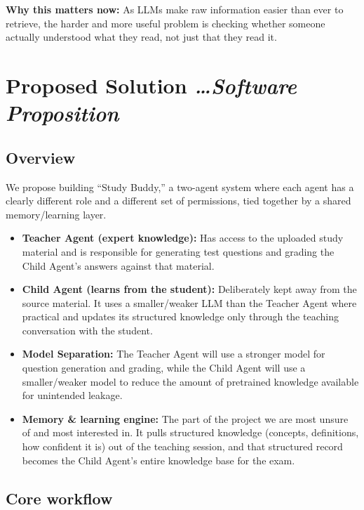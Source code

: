 \documentclass[11pt,a4paper]{article}
\newcommand{\mysection}[2]{%
    \section[#1]{#1 \hfill {\normalfont\itshape #2}}
}
\begin{document}
\textbf{Why this matters now:} As LLMs make raw information easier than ever to retrieve, the harder and more useful problem is checking whether someone actually understood what they read, not just that they read it.


\mysection{Proposed Solution}{\ldots Software Proposition}

\subsection{Overview}

We propose building ``Study Buddy,'' a two-agent system where each agent has a clearly different role and a different set of permissions, tied together by a shared memory/learning layer.

\begin{itemize}

    \item \textbf{Teacher Agent (expert knowledge):} Has access to the uploaded study material and is responsible for generating test questions and grading the Child Agent's answers against that material.

    \item \textbf{Child Agent (learns from the student):} Deliberately kept away from the source material. It uses a smaller/weaker LLM than the Teacher Agent where practical and updates its structured knowledge only through the teaching conversation with the student.

    \item\textbf{Model Separation:} The Teacher Agent will use a stronger model for question generation and grading, while the Child Agent will use a smaller/weaker model to reduce the amount of pretrained knowledge available for unintended leakage.

    \item \textbf{Memory \& learning engine:} The part of the project we are most unsure of and most interested in. It pulls structured knowledge (concepts, definitions, how confident it is) out of the teaching session, and that structured record becomes the Child Agent's entire knowledge base for the exam.

\end{itemize}

\subsection{Core workflow}
\end{document}
